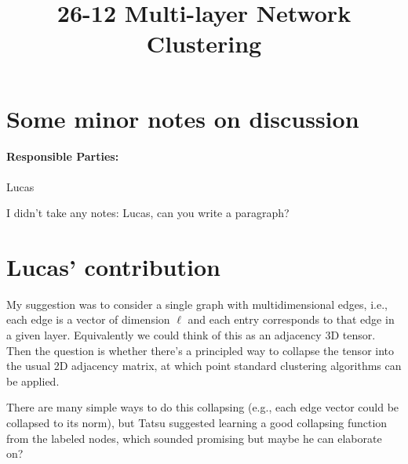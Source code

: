 \documentclass[11pt]{article}
\begin{document}
\title{26-12 Multi-layer Network Clustering}

\maketitle

\section{Some minor notes on discussion}

\paragraph{Responsible Parties:} Lucas

I didn't take any notes: Lucas, can you write a paragraph?

\section{Lucas' contribution}
My suggestion was to consider a single graph with multidimensional edges, i.e., each edge is a vector of dimension $\ell$ and each entry corresponds to that edge in a given layer. Equivalently we could think of this as an adjacency 3D tensor. Then the question is whether there's a principled way to collapse the tensor into the usual 2D adjacency matrix, at which point standard clustering algorithms can be applied. 

There are many simple ways to do this collapsing (e.g., each edge vector could be collapsed to its norm), but Tatsu suggested learning a good collapsing function from the labeled nodes, which sounded promising but maybe he can elaborate on?
\end{document}
